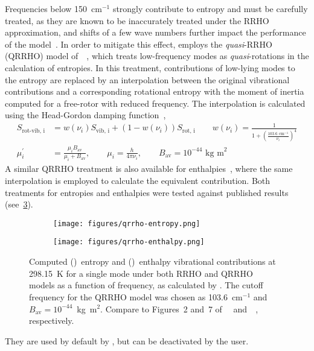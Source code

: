 Frequencies below 150~cm$^{-1}$ strongly contribute to entropy and must be carefully treated,
as they are known to be inaccurately treated under the RRHO approximation,
and shifts of a few wave numbers further impact the performance of the model~\cite{Ribeiro_2011,Grimme_2012,Jensen_2015,Ryu_2018}.
In order to mitigate this effect,
\overreact{} employs the \emph{quasi}-RRHO (QRRHO) model of~\citeauthor{Grimme_2012}~\cite{Grimme_2012},
which treats low-frequency modes as \emph{quasi}-rotations in the calculation of entropies.
In this treatment,
contributions of low-lying modes to the entropy are replaced by an interpolation between the original vibrational contributions and a corresponding rotational entropy with the moment of inertia computed for a free-rotor with reduced frequency.
The interpolation is calculated using the Head-Gordon damping function~\cite{Chai_2008},
% 
\begin{equation}
	\begin{split}
		S_\text{rot-vib,
			i}
		&= w(\nu_i) S_\text{vib,
			i}
		+ \left(
		1 - w(\nu_i)
		\right) S_\text{rot,
			i}
		\qquad
		w(\nu_i) = \frac{1}{
			1 + \left(
			\frac{
				103.6 \text{ cm}^{-1}
			}{\nu_i}
			\right)^4
		} \\
		\mu^\prime_i &= \frac{\mu_i B_\text{av}}{\mu_i + B_\text{av}},
		\qquad
		\mu_i = \frac{h}{4 \pi \nu_i},
		\qquad
		B_\text{av} = 10^{-44} \text{ kg m}^2
	\end{split}
\end{equation}
% 
A similar QRRHO treatment is also available for enthalpies~\cite{Li_2015},
where the same interpolation is employed to calculate the equivalent contribution.
Both treatments for entropies and enthalpies were tested against published results (see~\cref{fig:qrrho}).
% 
\begin{figure}[hbtp]
	\centering
	\begin{subfigure}[c]{0.5\textwidth}
		\centering
		\texttt{[image: figures/qrrho-entropy.png]}
		\caption{}\label{fig:qrrho-entropy}
	\end{subfigure}%
	\begin{subfigure}[c]{0.5\textwidth}
		\centering
		\texttt{[image: figures/qrrho-enthalpy.png]}
		\caption{}\label{fig:qrrho-enthalpy}
	\end{subfigure}%
	\caption{Computed ()~entropy and ()~enthalpy vibrational contributions at 298.15~K for a single mode under both RRHO and QRRHO~\cite{Grimme_2012,Li_2015} models as a function of frequency,
		as calculated by \overreact.
		The cutoff frequency for the QRRHO model was chosen as 103.6~cm$^{-1}$ and $B_\text{av} = 10^{-44}$~kg~m$^2$.
		Compare to Figures~2 and~7 of~\citeauthor{Grimme_2012}~\cite{Grimme_2012} and~\citeauthor{Li_2015}~\cite{Li_2015},
		respectively.}\label{fig:qrrho}
\end{figure}
% 
They are used by default by \overreact,
but can be deactivated by the user.

